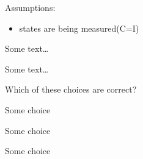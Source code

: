 \documentclass[UKenglish]{uioexam}
\begin{document}

Assumptions: 
\begin{itemize}

	\item states are being measured(C=I)
\end{itemize}


Some text\ldots


Some text\ldots


Which of these choices are correct?

\begin{choicelist}[]
    \choice
    Some choice

    \choice
    Some choice

    \choice
    Some choice
\end{choicelist}


\end{document}
